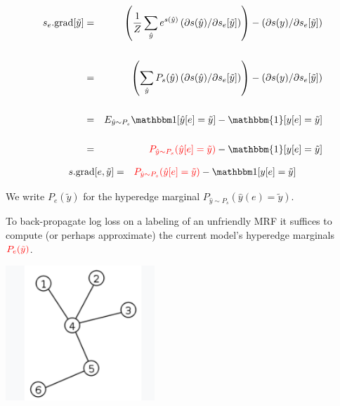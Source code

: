 {

\bigskip
\begin{eqnarray*}
    s_e.\mathrm{grad}[\tilde{y}]
    & = & \left(\frac{1}{Z} \sum_{\hat{y}} e^{s(\hat{y})} \left(\partial s(\hat{y})/\partial s_e[\tilde{y}]\right)\right)
    - \left(\partial s(y) /\partial s_e[\tilde{y}]\right)    \\
    \\
    & = & \left(\sum_{\hat{y}} P_s(\hat{y}) \left(\partial s(\hat{y})/\partial s_e[\tilde{y}]\right)\right)
    - \left(\partial s(y) /\partial s_e[\tilde{y}]\right)    \\
    \\
    & = & E_{\hat{y} \sim P_s}\bbone[\hat{y}[e] = \tilde{y}]
    - \mathbbm{1}[y[e] = \tilde{y}] \\
    \\
    & = & {\color{red} P_{\hat{y} \sim P_s}(\hat{y}[e] = \tilde{y})}
      - \mathbbm{1}[y[e] = \tilde{y}]
\end{eqnarray*}


\begin{eqnarray*}
    s.\mathrm{grad}[e,\tilde{y}]
    & = &  {\color{red} P_{\hat{y} \sim P_s}(\hat{y}[e] = \tilde{y})} - \bbone[y[e] = \tilde{y}] \\
\end{eqnarray*}

\vfill
We write {\color{red} $P_e(\tilde{y})$} for the {\color{red} hyperedge marginal} $P_{\hat{y} \sim P_s}(\hat{y}(e) = \tilde{y})$.

\vfill
To back-propagate log loss on a labeling of an unfriendly MRF {\color{red} it suffices to compute (or perhaps approximate)
the current model's hyperedge marginals ${\color{red} P_e(\tilde{y})}$.}


\centerline{\includegraphics[height= 2in]{../images/Tree}}

}
